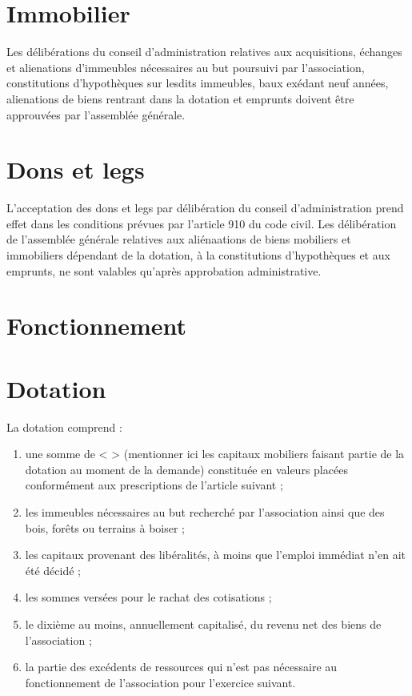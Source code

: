 \documentclass[a4paper,defaultorg]{organisation-contract}
\begin{document}
\section{Immobilier}
Les délibérations du conseil d'administration relatives aux acquisitions,
échanges et alienations d'immeubles nécessaires au but poursuivi par
l'association, constitutions d'hypothèques sur lesdits immeubles, baux exédant
neuf années, alienations de biens rentrant dans la dotation et emprunts doivent
être approuvées par l'assemblée générale.

\section{Dons et legs}
L'acceptation des dons et legs par délibération du conseil d'administration
prend effet dans les conditions prévues par l'article 910 du code civil. Les
délibération de l'assemblée générale relatives aux aliénaations de biens
mobiliers et immobiliers dépendant de la dotation, à la constitutions
d'hypothèques et aux emprunts, ne sont valables qu'après approbation
administrative.

\section{Fonctionnement}

\section{Dotation}
La dotation comprend :
\begin{enumerate}
    \item une somme de < > (mentionner ici les capitaux mobiliers faisant partie de la dotation au moment de la
        demande) constituée en valeurs placées conformément aux prescriptions de l'article suivant ;
    \item les immeubles nécessaires au but recherché par l'association ainsi que des bois, forêts ou terrains à
        boiser ;
    \item les capitaux provenant des libéralités, à moins que l'emploi immédiat n'en ait été décidé ;
    \item les sommes versées pour le rachat des cotisations ;
    \item le dixième au moins, annuellement capitalisé, du revenu net des biens de l'association ;
    \item la partie des excédents de ressources qui n'est pas nécessaire au fonctionnement de l'association pour
        l'exercice suivant.
\end{enumerate}
\end{document}
